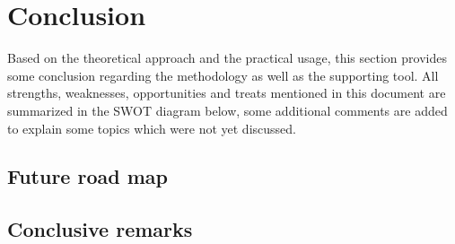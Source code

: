 
\section{Conclusion}
\label{sec:conclusion}
Based on the theoretical approach and the practical usage, this section provides some conclusion regarding the methodology as well as the supporting tool.
All strengths, weaknesses, opportunities and treats mentioned in this document are summarized in the SWOT diagram below, some additional comments are added to explain some topics which were not yet discussed.



\subsection{Future road map}

\subsection{Conclusive remarks}